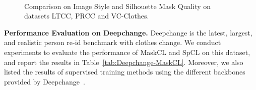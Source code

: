\documentclass[10pt,twocolumn,letterpaper]{article}
\newcommand{\reid}{re-id}
\newcommand{\myparagraph}[1]{\noindent\textbf{#1.}}
\begin{document}
\begin{figure}[!htb]
\begin{center}
   ~~~~
   ~~~~
\end{center}
\vspace{-6pt}
   \caption{Comparison on Image Style and Silhouette Mask Quality on datasets LTCC, PRCC and VC-Clothes.}
\label{fig:imagequality}
\vspace{-10pt}
\end{figure}




\myparagraph{Performance Evaluation on Deepchange} 
Deepchange is the latest, largest, and realistic person \reid{} benchmark with clothes change. We conduct experiments to evaluate the performance of MaskCL and SpCL on this dataset, and report the results in Table~\ref{tab:Deepchange-MaskCL}. Moreover, we also listed the results of supervised training methods using the different backbones provided by Deepchange~\cite{Deepchange}.

\begin{table}[!htb]
\small
    \begin{center}
    \vspace{-5pt}
    \end{center}
    \vspace{-5pt}
    \caption{Experimental Results on Deepchange.}
    \label{tab:Deepchange-MaskCL}
    \vspace{-2pt}
    \end{table}
\end{document}
